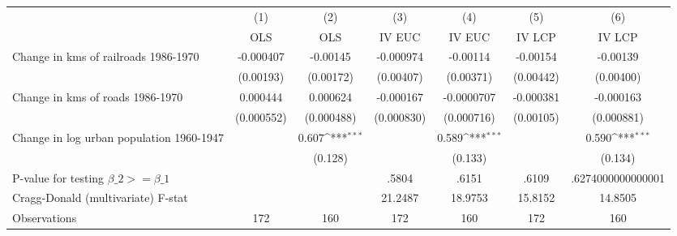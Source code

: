 {
\def\sym#1{\ifmmode^{#1}\else\(^{#1}\)\fi}
\begin{tabular}{l*{6}{c}}
\hline\hline
                &\multicolumn{1}{c}{(1)}&\multicolumn{1}{c}{(2)}&\multicolumn{1}{c}{(3)}&\multicolumn{1}{c}{(4)}&\multicolumn{1}{c}{(5)}&\multicolumn{1}{c}{(6)}\\
                &\multicolumn{1}{c}{OLS}&\multicolumn{1}{c}{OLS}&\multicolumn{1}{c}{IV EUC}&\multicolumn{1}{c}{IV EUC}&\multicolumn{1}{c}{IV LCP}&\multicolumn{1}{c}{IV LCP}\\
\hline
Change in kms of railroads 1986-1970&-0.000407         & -0.00145         &-0.000974         & -0.00114         & -0.00154         & -0.00139         \\
                &(0.00193)         &(0.00172)         &(0.00407)         &(0.00371)         &(0.00442)         &(0.00400)         \\
[1em]
Change in kms of roads 1986-1970& 0.000444         & 0.000624         &-0.000167         &-0.0000707         &-0.000381         &-0.000163         \\
                &(0.000552)         &(0.000488)         &(0.000830)         &(0.000716)         &(0.00105)         &(0.000881)         \\
[1em]
Change in log urban population 1960-1947&                  &    0.607\sym{***}&                  &    0.589\sym{***}&                  &    0.590\sym{***}\\
                &                  &  (0.128)         &                  &  (0.133)         &                  &  (0.134)         \\
\hline
P-value for testing $\beta\_{2} >= \beta\_{1}$&                  &                  &    .5804         &    .6151         &    .6109         &.6274000000000001         \\
Cragg-Donald (multivariate) F-stat&                  &                  &  21.2487         &  18.9753         &  15.8152         &  14.8505         \\
Observations    &      172         &      160         &      172         &      160         &      172         &      160         \\
\hline\hline
\end{tabular}
}
